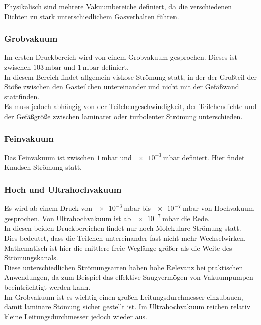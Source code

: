 			\noindent
		Physikalisch sind mehrere Vakuumbereiche definiert, da die verschiedenen Dichten zu stark unterschiedlichem Gasverhalten führen. 

		\subsubsection{Grobvakuum}
			\noindent
			Im ersten Druckbereich wird von einem Grobvakuum gesprochen. Dieses ist zwischen $\SI{103}{\milli\bar}$ und $\SI{1}{\milli\bar}$ definiert.\\
			In diesem Bereich findet allgemein viskose Strömung statt, in der der Großteil der Stöße zwischen den Gasteilchen untereinander und nicht mit der Gefäßwand stattfinden.\\
			Es muss jedoch abhängig von der Teilchengeschwindigkeit, der Teilchendichte und der Gefäßgröße zwischen laminarer oder turbolenter Strömung unterschieden. 

		\subsubsection{Feinvakuum}

			\noindent
			Das Feinvakuum ist zwischen $\SI{1}{\milli\bar}$ und $\SI{e-3}{\milli\bar}$ definiert. Hier findet Knudsen-Strömung statt.

			\noindent
		\subsubsection{Hoch und Ultrahochvakuum} 
			Es wird ab einem Druck von $\SI{e-3}{\milli\bar}$ bis $\SI{e-7}{\milli\bar}$ von Hochvakuum gesprochen. Von Ultrahochvakuum ist ab $\SI{e-7}{\milli\bar}$ die Rede.	\\	
			In diesen beiden Druckbereichen findet nur noch Molekulare-Strömung statt.\\
			Dies bedeutet, dass die Teilchen untereinander fast nicht mehr Wechselwirken. Mathematisch ist hier die mittlere freie Weglänge größer als die Weite des Strömungskanals.
		\\
		Diese unterschiedlichen Strömungsarten haben hohe Relevanz bei praktischen Anwendungen, da zum Beispiel das effektive Saugvermögen von Vakuumpumpen beeinträchtigt werden kann.\\
		Im Grobvakuum ist es wichtig einen großen Leitungsdurchmesser einzubauen, damit laminare Stömung sicher gestellt ist.
		Im Ultrahochvakuum reichen relativ kleine Leitungsdurchmesser jedoch wieder aus.

